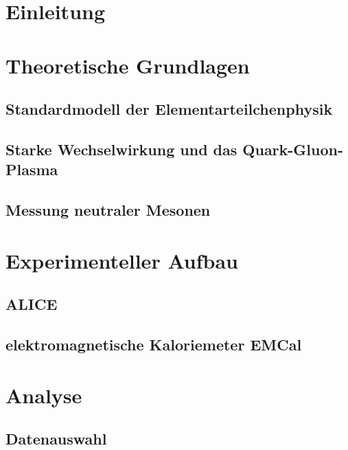 \documentclass[11pt]{article}
\author{Marvin Hemmer}
\begin{document}
\begin{titlepage}
\begin{center}

\end{center}
\end{titlepage}
\newpage
\tableofcontents
\newpage

\section*{Einleitung}

\section{Theoretische Grundlagen} \label{s1}
\subsection{Standardmodell der Elementarteilchenphysik} \label{s1s1}

\subsection{Starke Wechselwirkung und das Quark-Gluon-Plasma} \label{s1s2}

\subsection{Messung neutraler Mesonen} \label{s1s3}

\section{Experimenteller Aufbau} \label{s2}
\subsection{ALICE} \label{s2s1}
\subsection{elektromagnetische Kaloriemeter EMCal} \label{s2s2}

\section{Analyse} \label{s3}

\subsection{Datenauswahl} \label{s3s1}
\end{document}
